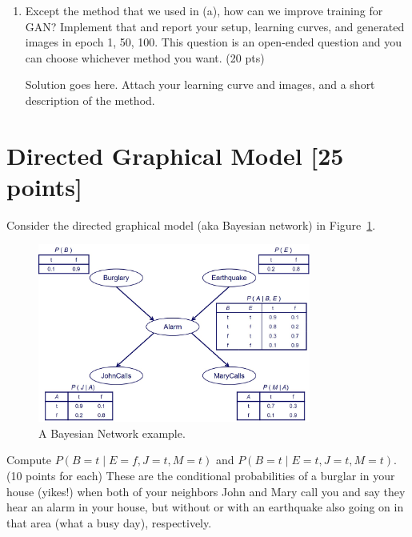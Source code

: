 \documentclass[a4paper]{article}
\theoremstyle{definition}
\newenvironment{soln}{
	\leavevmode\color{blue}\ignorespaces
}{}
\begin{document}
\begin{enumerate} [label=(\alph*)]
		\item Except the method that we used in (a), how can we improve training for GAN? Implement that and report your setup, learning curves, and generated images in epoch 1, 50, 100.
        This question is an open-ended question and you can choose whichever method you want.
		\hfill (20 pts)
		
		\begin{soln}  Solution goes here. Attach your learning curve and images, and a short description of the method. \end{soln}
		
	\end{enumerate}

\section{Directed Graphical Model [25 points]}
Consider the directed graphical model (aka Bayesian network) in Figure~\ref{fig:bn}.
\begin{figure}[H]
    \centering
    \includegraphics[width=0.8\textwidth]{BN.jpeg}
    \caption{A Bayesian Network example.}
    \label{fig:bn}
\end{figure}
Compute $P(B=t \mid E=f,J=t,M=t)$ and $P(B=t \mid E=t,J=t,M=t)$. (10 points for each) These are the conditional probabilities of a burglar in your house (yikes!) when both of your neighbors John and Mary call you and say they hear an alarm in your house, but without or with an earthquake also going on in that area (what a busy day), respectively.
\end{document}
